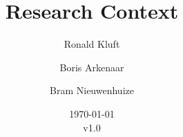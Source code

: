 \documentclass{article}
\begin{document}
 

\title{Research Context}
\author{Ronald Kluft \and Boris Arkenaar \and Bram Nieuwenhuize}
\date{\today\\v1.0}
\maketitle 





\printglossaries
\end{document}
